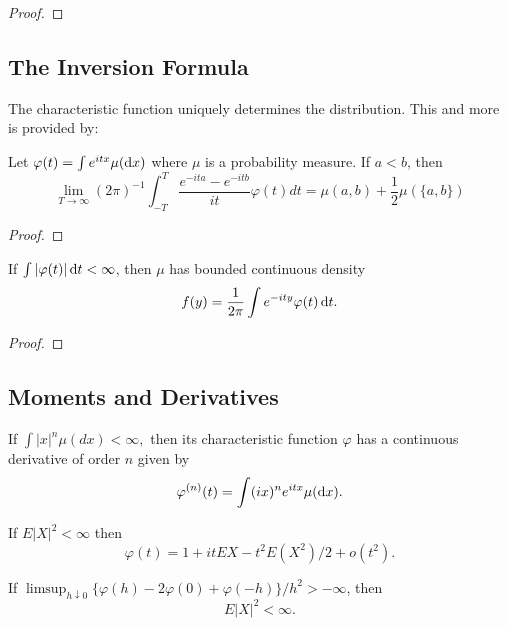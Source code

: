 \begin{proof}

\end{proof}

\subsection{The Inversion Formula}

The characteristic function uniquely determines the distribution. This and more is provided by:
\begin{theorem}
	Let $\varphi(t)=\int e^{itx}\mu(\mathop{}\!\mathrm{d} x)$ where $\mu$ is a probability measure. If $a<b$, then
	\begin{equation}
		\lim _{T \rightarrow \infty}(2 \pi)^{-1} \int_{-T}^{T} \frac{e^{-i t a}-e^{-i t b}}{i t} \varphi(t) d t=\mu(a, b)+\frac{1}{2} \mu(\{a, b\})
	\end{equation}
\end{theorem}

\begin{proof}

\end{proof}

\begin{theorem}
	If $\int|\varphi(t)|\mathop{}\!\mathrm{d} t<\infty$, then $\mu$ has bounded continuous density
	\begin{equation}
		f(y)=\frac{1}{2\pi}\int e^{-ity}\varphi(t) \mathop{}\!\mathrm{d} t.
	\end{equation}
\end{theorem}

\begin{proof}

\end{proof}

\subsection{Moments and Derivatives}

\begin{theorem}
	If $\int|x|^{n}\mu(d x)<\infty,$ then its characteristic function $\varphi$ has a continuous derivative of order $n$ given by
	\begin{equation}
		\varphi^{(n)}(t)=\int(i x)^{n}e^{itx}\mu(\mathop{}\!\mathrm{d} x).
	\end{equation}
\end{theorem}

\begin{theorem}
	If $E|X|^{2}<\infty$ then
	\begin{equation}
		\varphi(t)=1+itEX-t^{2}E\left(X^{2}\right)/2+o\left(t^{2}\right).
	\end{equation}
\end{theorem}

\begin{theorem}
	If $\limsup_{h\downarrow 0}\{\varphi(h)-2\varphi(0)+\varphi(-h)\}/h^{2}>-\infty$, then
	\begin{equation}
		E|X|^{2}<\infty.
	\end{equation}
\end{theorem}
